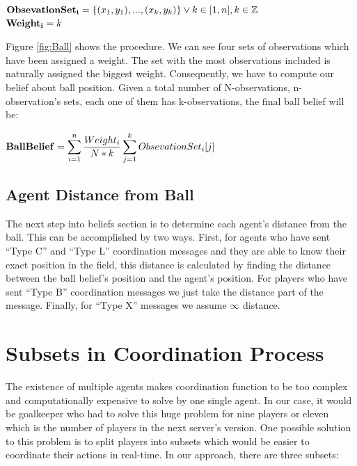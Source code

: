 \begin{center}
${\bf Obsevation Set_{i} } = \lbrace (x_{1},y_{1}),...,(x_{k},y_{k}) \rbrace \vee k \in [1,n] , k\in \mathbb{Z}$\\
${\bf Weight_{i}} = k$\\
\end{center}
Figure \ref{fig:Ball} shows the procedure. We can see four sets of observations which have been assigned a weight. The set with the most observations included is naturally assigned the biggest weight. Consequently, we have to compute our belief about ball position.
Given a total number of N-observations, n-observation's sets, each one of them has k-observations, the final ball belief will be:\\
\begin{center}
${\bf Ball Belief} = \displaystyle\sum\limits_{i=1}^n \frac {Weight_{i}} {N \ast k}  \displaystyle\sum\limits_{j=1}^k Obsevation Set_{i}[j]$
\end{center}



\subsection{Agent Distance from Ball}
The next step into beliefs section is to determine each agent's distance from the ball. This can be accomplished by two ways. First, for agents who have sent ``Type C'' and ``Type L'' coordination messages and they are able to know their exact position in the field, this distance is calculated by finding the distance between the ball belief's position and the agent's position. For players who have sent ``Type B'' coordination messages we just take the distance part of the message. Finally, for ``Type X'' messages we assume $\infty$ distance.


\section{Subsets in Coordination Process}
The existence of multiple agents makes coordination function to be too complex and computationally expensive to solve by one single agent. In our case, it would be goalkeeper who had to solve this huge problem for nine players or eleven which is the number of players in the next server's version. 
One possible solution to this problem is to split players into subsets which would be easier to coordinate their actions in real-time. In our approach, there are three subsets:

